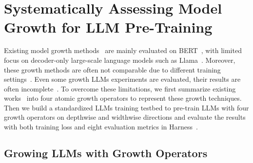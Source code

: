 \documentclass{article}
\begin{document}
\section{Systematically Assessing Model Growth for LLM Pre-Training}\label{sec:operator_and_eval}

Existing model growth methods~\cite{gong2019efficient, chen2021bert2bert, yang2020progressively, wang2023learning, wang2023lemon, shen2022staged, evci2022gradmax, yao2024masked} are mainly evaluated on BERT~\cite{devlin2019bert}, 
with limited focus on decoder-only large-scale language models such as Llama~\cite{touvron2023llama}. Moreover, these growth methods are often not comparable due to different training settings~\cite{gong2019efficient,chen2021bert2bert,yao2024masked,wang2023lemon}. Even some growth LLMs experiments are evaluated, their results are often incomplete~\citep{li2023flm101b,wang2023learning}.
To overcome these limitations, we first summarize existing works~\cite{gong2019efficient, chen2021bert2bert, yang2020progressively, wang2023learning, wang2023lemon, shen2022staged, evci2022gradmax, yao2024masked} into four atomic growth operators to represent these growth techniques. Then we build a standardized LLMs training testbed to pre-train LLMs with four growth operators on depthwise and widthwise directions and evaluate the results with both training loss and eight evaluation metrics in Harness~\cite{eval-harness}.

\subsection{Growing LLMs with Growth Operators}\label{subsec:operators}
\end{document}
